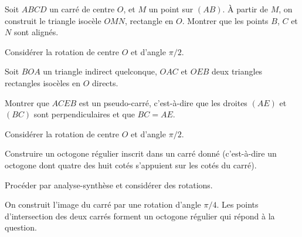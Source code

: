 \begin{exo}[Alignement] %


Soit $ABCD$ un carré de centre $O$, et $M$ un point sur $(AB)$. À partir de $M$, on construit le triangle isocèle $OMN$, rectangle en $O$. Montrer que les points $B$, $C$ et $N$ sont alignés.

\begin{hint}   
Considérer la rotation de centre $O$ et d'angle $\pi/2$.
\end{hint}

\end{exo}  


\begin{exo} %

Soit $BOA$ un triangle indirect quelconque, $OAC$ et $OEB$  deux triangles rectangles isocèles en $O$ directs.

Montrer que $ACEB$ est un pseudo-carré, c'est-à-dire que les droites $(AE)$ et $(BC)$ sont perpendiculaires et que $BC = AE$.

\begin{hint}   
Considérer la rotation de centre $O$ et d'angle $\pi/2$.
\end{hint}
\end{exo}  



\begin{exo}
Construire  un octogone régulier inscrit dans un carré donné (c'est-à-dire un octogone dont quatre des huit cotés s'appuient sur les cotés du carré).

\begin{hint}   
Procéder par analyse-synthèse et considérer des rotations.
\end{hint}
\begin{sol}
On construit l'image du carré par une rotation d'angle $\pi/4$. Les points d'intersection des deux carrés forment un octogone régulier qui répond à la question.
\end{sol}
\end{exo}



